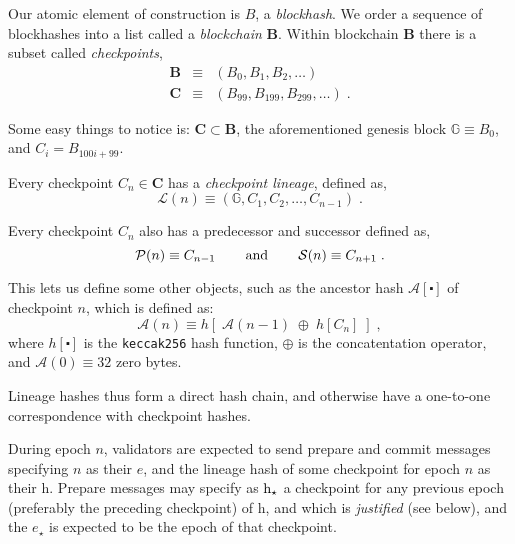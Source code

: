 \documentclass[12pt, final]{article}
\newcommand{\epoch}{\ensuremath{e}\xspace}
\newcommand{\hash}{\textnormal{h}\xspace}
\newcommand{\epochsource}{\ensuremath{\epoch_{\star}}\xspace}
\newcommand{\hashsource}{\ensuremath{\hash_{\star}}\xspace}
\newcommand{\Genesisblock}{\ensuremath{\mathds{G}}\xspace}
\begin{document}
Our atomic element of construction is $B$, a \emph{blockhash}. We order a sequence of blockhashes into a list called a \emph{blockchain} $\mathbf{B}$.  Within blockchain $\mathbf{B}$ there is a subset called \emph{checkpoints},
\begin{eqnarray}
    \mathbf{B} &\equiv& \left( B_0, B_1, B_2, \ldots \right) \\
    \mathbf{C} &\equiv& \left( B_{99}, B_{199}, B_{299}, \ldots \right) \; .
\end{eqnarray}

Some easy things to notice is: $\mathbf{C} \subset \mathbf{B}$, the aforementioned genesis block $\Genesisblock \equiv B_0$, and $C_i = B_{100i + 99}$.  

Every checkpoint $C_n \in \mathbf{C}$ has a \emph{checkpoint lineage}, defined as,
\begin{equation}
    \mathcal{L}(n) \equiv ( \Genesisblock, C_1, C_2, \ldots, C_{n-1} ) \; .
\end{equation}


Every checkpoint $C_n$ also has a predecessor and successor defined as,
\begin{equation}
    \mathcal{P}(n) \equiv C_{n-1} \hspace{0.3in}\textnormal{and}\hspace{0.3in} \mathcal{S}(n) \equiv C_{n+1} \; .
\end{equation}

This lets us define some other objects, such as the ancestor hash $\mathcal{A}[\centerdot]$ of checkpoint $n$, which is defined as:
\begin{equation}
    \mathcal{A}( n ) \equiv h\left[ \; \mathcal{A}(n-1) \; \oplus \; h[C_n] \; \right] \; ,
\end{equation}
where $h[\centerdot]$ is the \texttt{keccak256} hash function, $\oplus$ is the concatentation operator, and $\mathcal{A}(0) \equiv 32$ zero bytes.


Lineage hashes thus form a direct hash chain, and otherwise have a one-to-one correspondence with checkpoint hashes.

During epoch $n$, validators are expected to send prepare and commit messages specifying $n$ as their \epoch, and the lineage hash of some checkpoint for epoch $n$ as their \hash. Prepare messages may specify as \hashsource a checkpoint for any previous epoch (preferably the preceding checkpoint) of \hash, and which is \textit{justified} (see below), and the \epochsource is expected to be the epoch of that checkpoint.
\end{document}
